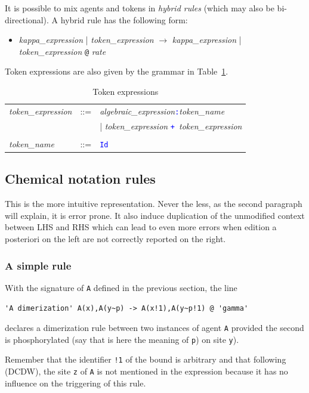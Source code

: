 \documentclass[11pt]{book}
\def\tcb#1{\textcolor{blue}{\ttt{#1}}}
\def\ttt#1{\texttt{#1}}
\def\rar{\rightarrow}
\def\ITE#1{\begin{itemize}#1\end{itemize}}
\def\imp#1{\emph{#1}\index{#1}}
\begin{document}
It is possible to mix
agents and tokens in \imp{hybrid rules} (which may also be
bi-directional). A hybrid rule has the following form:

\ITE{
\item[] {\it kappa\_expression} | {\it token\_expression} $\rar$ {\it kappa\_expression}  | {\it token\_expression }\ttt{@} {\it rate}
}

Token expressions are also given by the grammar in
Table~\ref{tab:tokens}.
\begin{table}[ht!]
  \centering
  \caption{Token expressions}
  \begin{tabular}{@{} lcl @{}}
   \textit{token\_expression} &::=&  \textit{algebraic\_expression}\tcb{:}\textit{token\_name} \\
	&&|  \textit{token\_expression} \tcb{+}\ \textit{token\_expression} \\\\
   \textit{token\_name} &::=& \tcb{Id}\\
  \end{tabular}
  \label{tab:tokens}
\end{table}

\subsection{Chemical notation rules}

This is the more intuitive representation. Never the less, as the
second paragraph will explain, it is error prone. It also induce
duplication of the unmodified context between LHS and RHS which can
lead to even more errors when edition a posteriori on the left are not
correctly reported on the right.

\subsubsection*{A simple rule}
With the signature of \ttt{A} defined in the
previous section, the line
\begin{lstlisting}[language=kappa]
'A dimerization' A(x),A(y~p) -> A(x!1),A(y~p!1) @ 'gamma'
\end{lstlisting}
declares a dimerization rule between two instances of agent \ttt{A}
provided the second is phosphorylated (say that is here the meaning of
\ttt{p}) on site \ttt{y}).

Remember that the identifier \ttt{!1} of the bound is arbitrary and
that following (DCDW), the site \ttt{z}
of \ttt{A} is not mentioned in the expression because it has no
influence on the triggering of this rule.
\end{document}
